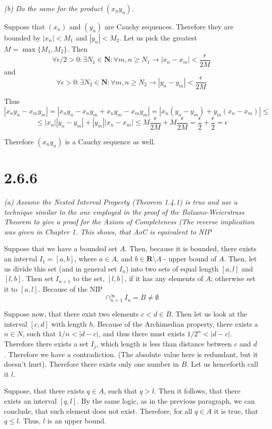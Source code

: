\documentclass[11pt,oneside,titlepage]{article}
\begin{document}
\textit{(b) Do the same for the product $(x_n y_n)$.}

Suppose that $(x_n)$ and $(y_n)$ are Cauchy sequences. Therefore
they are bounded by $|x_n| < M_1$ and $|y_n| < M_2$. Let us pick the
greatest $M = \max\{M_1, M_2\}$. Then
$$\forall \epsilon/2 > 0: \exists N_1 \in \textbf{N}: \forall m,n \geq N_1 \to
|x_n - x_m| < \frac{\epsilon}{2M}$$
and
$$\forall \epsilon > 0: \exists N_2 \in \textbf{N}: \forall m,n \geq N_2 \to
|y_n - y_m| < \frac{\epsilon}{2M}$$

Thus 
$$|x_n y_n - x_m y_m| = |x_n y_n - x_n y_m + x_n y_m - x_m y_m | =
|x_n (y_n - y_m) +  y_m( x_n - x_m) | \leq$$
$$ \leq |x_n||y_n - y_m| + |y_m| |x_n - x_m| \leq M \frac{\epsilon}{2M} +
M \frac{\epsilon}{2M} = \frac{\epsilon}{2} + \frac{\epsilon}{2} = \epsilon$$

Therefore $(x_n y_n)$ is a Cauchy sequence as well.

\section*{2.6.6}

\textit{(a) Assume the Nested Interval Property (Theorem 1.4.1) is true and
  use a technique similar to the one employed in the proof of the
  Bolzano-Weierstrass Theorem to give a proof for the Axiom of Completeness
  (The reverse implication was given in Chapter 1. This shows, that AoC is
  equivalent to NIP}

Suppose that we have a bounded set $A$. Then, because it is bounded, there
exists an interval $I_1 = [a, b]$, where $a \in A$, and
$b \in \textbf{R} \setminus A$ - upper bound of $A$. Then, let us
divide this set (and in general set $I_n$) into two sets of equal
length $[a, l]$ and $[l, b]$.
Then set $I_{n + 1}$ to the set, $[l, b]$, if it has any elements of $A$;
otherwise set it to $[a, l]$. Because of the NIP
$$\cap_{n = 1}^{\infty} I_n  = B\neq \emptyset$$

Suppose now, that there exist two elements $c < d \in B$. Then let us
look at the interval $[c, d]$ with length $h$. Because of the Archimedian
property, there exists a $n \in N$, such that $1/n < |d - c|$, and thus
there must exists $1/2^n < |d - c|$. Therefore there exists a set $I_j$, which
length is less than distance between $c$ and $d$. Therefore we
have a contradiction. (The absolute value here is redundant, but it doesn't
hurt). Therefore there exists only one number in $B$. Let us henceforth call
it $l$.

Suppose, that there exists  $q \in A$, such that $q > l$. Then it follows,
that there exists an interval $[q, l]$. By the same logic, as in the previous
paragraph, we can conclude, that such element does not exist. Therefore,
for all $q \in A$ it is true, that $q \leq l$. Thus, $l$ is an upper bound.
\end{document}
